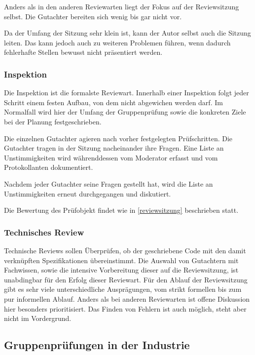 \documentclass[	%
		fontsize=11pt,  %
		a4paper,	    %
		ngerman,		%
		sans,			%
		f4,				%
	]{HsH-report}		%
\begin{document}
Anders als in den anderen Reviewarten liegt der Fokus auf der Reviewsitzung
selbst. Die Gutachter bereiten sich wenig bis gar nicht vor.

Da der Umfang der Sitzung sehr klein ist, kann der Autor selbst auch die
Sitzung leiten. Das kann jedoch auch zu weiteren Problemen führen, wenn dadurch
fehlerhafte Stellen bewusst nicht präsentiert werden.

\subsubsection{Inspektion} \label{inspektion}

Die Inspektion ist die formalste Reviewart. Innerhalb einer Inspektion folgt
jeder Schritt einem festen Aufbau, von dem nicht abgewichen werden darf. Im
Normalfall wird hier der Umfang der Gruppenprüfung sowie die konkreten Ziele
bei der Planung festgeschrieben.

Die einzelnen Gutachter agieren nach vorher festgelegten Prüfschritten. Die
Gutachter tragen in der Sitzung nacheinander ihre Fragen. Eine Liste an
Unstimmigkeiten wird währenddessen vom Moderator erfasst und vom Protokollanten
dokumentiert.

Nachdem jeder Gutachter seine Fragen gestellt hat, wird die Liste an
Unstimmigkeiten erneut durchgegangen und diskutiert.

Die Bewertung des Prüfobjekt findet wie in \ref{reviewsitzung} beschrieben
statt.

\subsubsection{Technisches Review} \label{technischesreview}

Technische Reviews sollen Überprüfen, ob der geschriebene Code mit den damit
verknüpften Spezifikationen übereinstimmt. Die Auswahl von Gutachtern mit
Fachwissen, sowie die intensive Vorbereitung dieser auf die Reviewsitzung, ist
unabdingbar für den Erfolg dieser Reviewart. Für den Ablauf der Reviewsitzung
gibt es sehr viele unterschiedliche Ausprägungen, vom strikt formellen bis zum
pur informellen Ablauf. Anders als bei anderen Reviewarten ist offene
Diskussion hier besonders prioritisiert. Das Finden von Fehlern ist auch
möglich, steht aber nicht im Vordergrund.

\subsection{Gruppenprüfungen in der Industrie}
\end{document}
